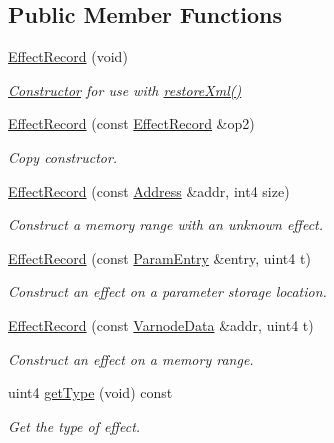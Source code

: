 \subsection*{Public Member Functions}
\begin{DoxyCompactItemize}
\item 
\mbox{\hyperlink{class_effect_record_a1a7281494fb82c6ee35958e9d98d3160}{Effect\+Record}} (void)
\begin{DoxyCompactList}\small\item\em \mbox{\hyperlink{class_constructor}{Constructor}} for use with \mbox{\hyperlink{class_effect_record_a4d01d27a405f3e595bc4e36bebfd33ca}{restore\+Xml()}} \end{DoxyCompactList}\item 
\mbox{\hyperlink{class_effect_record_ab05dcd1cc8377142d6a1427fedddcf21}{Effect\+Record}} (const \mbox{\hyperlink{class_effect_record}{Effect\+Record}} \&op2)
\begin{DoxyCompactList}\small\item\em Copy constructor. \end{DoxyCompactList}\item 
\mbox{\hyperlink{class_effect_record_af6e5a41aef5377b54447548ee514d0fc}{Effect\+Record}} (const \mbox{\hyperlink{class_address}{Address}} \&addr, int4 size)
\begin{DoxyCompactList}\small\item\em Construct a memory range with an unknown effect. \end{DoxyCompactList}\item 
\mbox{\hyperlink{class_effect_record_ab660482ee12ca9bf6c341c004f161b3f}{Effect\+Record}} (const \mbox{\hyperlink{class_param_entry}{Param\+Entry}} \&entry, uint4 t)
\begin{DoxyCompactList}\small\item\em Construct an effect on a parameter storage location. \end{DoxyCompactList}\item 
\mbox{\hyperlink{class_effect_record_a7404377ab3098d76448992abb3785666}{Effect\+Record}} (const \mbox{\hyperlink{struct_varnode_data}{Varnode\+Data}} \&addr, uint4 t)
\begin{DoxyCompactList}\small\item\em Construct an effect on a memory range. \end{DoxyCompactList}\item 
uint4 \mbox{\hyperlink{class_effect_record_a524045f2df2655c5d37c99e4297acfdf}{get\+Type}} (void) const
\begin{DoxyCompactList}\small\item\em Get the type of effect. \end{DoxyCompactList}\item 

\end{DoxyCompactItemize}
